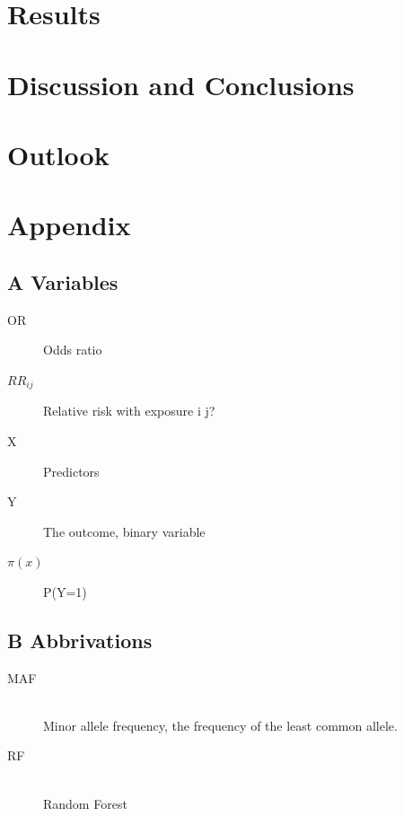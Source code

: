 \documentclass[10pt,a4paper]{report}
\begin{document}
\chapter{Results}


\chapter{Discussion and Conclusions}

\chapter{Outlook}

\chapter{Appendix}
\section{A Variables}
\begin{description}
  \item[OR]
	Odds ratio
	\item[$RR_{ij}$]
	Relative risk with exposure i j?
	\item[X]
	Predictors
	\item[Y]
	The outcome, binary variable
	\item[$\pi(x)$]
	P(Y=1)
\end{description}

\section{B Abbrivations}
\begin{description}
  \item[MAF] \hfill \\
	Minor allele frequency, the frequency of the least common allele.
	\item[RF] \hfill \\
	Random Forest
\end{description}



\newpage


\end{document}
